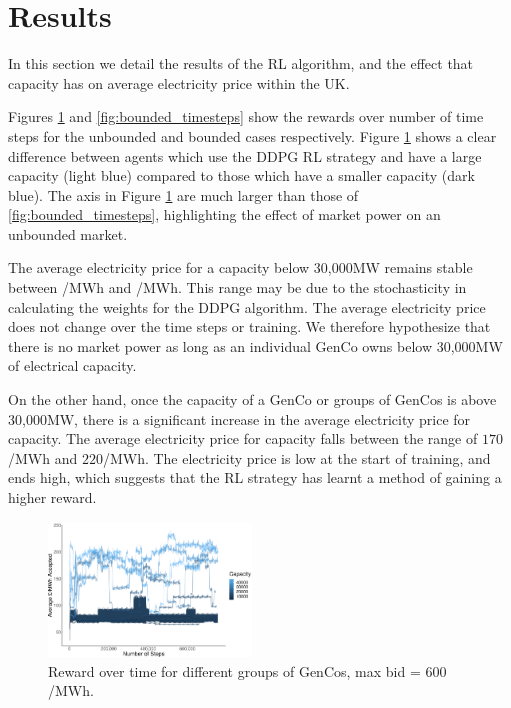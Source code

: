 \documentclass[conference]{IEEEtran}
\begin{document}




\section{Results}
\label{sec:results}

In this section we detail the results of the RL algorithm, and the effect that capacity has on average electricity price within the UK.

Figures \ref{fig:unbounded_timesteps} and \ref{fig:bounded_timesteps} show the rewards over number of time steps for the unbounded and bounded cases respectively. Figure \ref{fig:unbounded_timesteps} shows a clear difference between agents which use the DDPG RL strategy and have a large capacity (light blue) compared to those which have a smaller capacity (dark blue). The axis in Figure \ref{fig:unbounded_timesteps} are much larger than those of \ref{fig:bounded_timesteps}, highlighting the effect of market power on an unbounded market.

The average electricity price for a capacity below 30,000MW remains stable between /MWh and /MWh. This range may be due to the stochasticity in calculating the weights for the DDPG algorithm. The average electricity price does not change over the time steps or training. We therefore hypothesize that there is no market power as long as an individual GenCo owns below 30,000MW of electrical capacity. 

On the other hand, once the capacity of a GenCo or groups of GenCos is above 30,000MW, there is a significant increase in the average electricity price for capacity. The average electricity price for capacity falls between the range of  \textsterling$170$/MWh and \textsterling$220$/MWh. The electricity price is low at the start of training, and ends high, which suggests that the RL strategy has learnt a method of gaining a higher reward.




\begin{figure}
    \includegraphics[width=0.48\textwidth]{figures/results/unbounded_results.pdf}
    \caption{Reward over time for different groups of GenCos, max bid = \textsterling $600$/MWh.}
    \label{fig:unbounded_timesteps}
\end{figure}
\end{document}
